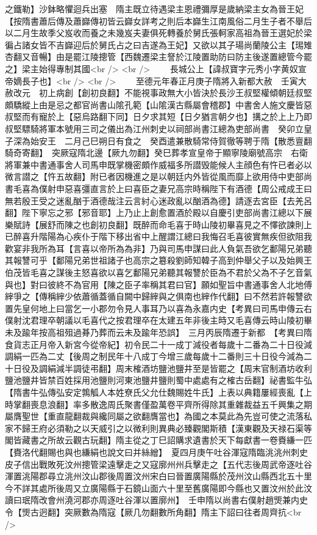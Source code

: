 之鐵勒】沙鉢略懼迴兵出塞　隋主既立待遇梁主恩禮彌厚是歲納梁主女為晉王妃【按隋書蕭后傳及蕭巋傳初皆云巋女詳考之則后本巋生江南風俗二月生子者不舉后以二月生故季父岌收而養之未幾岌夫妻俱死轉養於舅氏張軻家高祖為晉王選妃於梁徧占諸女皆不吉巋迎后於舅氏占之曰吉遂為王妃】又欲以其子瑒尚蘭陵公主【㻛雉杏翻又音暢】由是罷江陵摠管【西魏遷梁主詧於江陵置助防曰防主後遂置總管今罷之】梁主始得專制其國<br />
<br />
　　長城公上【諱叔寶字元秀小字黄奴宣帝嫡長子也】<br />
<br />
　　至德元年春正月庚子隋將入新都大赦　壬寅大赦改元　初上病創【創初良翻】不能視事政無大小皆決於長沙王叔堅權傾朝廷叔堅頗驕縱上由是忌之都官尚書山隂孔範【山隂漢古縣屬會稽郡】中書舍人施文慶皆惡叔堅而有寵於上【惡烏路翻下同】日夕求其短【日夕猶言朝夕也】搆之於上上乃即叔堅驃騎將軍本號用三司之儀出為江州刺史以祠部尚書江總為吏部尚書　癸卯立皇子深為始安王　二月己巳朔日有食之　癸酉遣兼散騎常侍賀徹等聘于隋【散悉亶翻騎奇寄翻】　突厥寇隋北邊【厥九勿翻】癸巳葬孝宣皇帝于顯寧陵廟號高宗　右衛將軍兼中書通事舍人司馬申既掌機密頗作威福多所譛毁能候人主顔色有忤已者必以微言譛之【忤五故翻】附已者因機進之是以朝廷内外皆從風而靡上欲用侍中吏部尚書毛喜為僕射申惡喜彊直言於上曰喜臣之妻兄高宗時稱陛下有酒德【周公戒成王曰無若殷王受之迷亂酗于酒德哉注云言紂心迷政亂以酗酒為德】請逐去宮臣【去羌呂翻】陛下寧忘之邪【邪音耶】上乃止上創愈置酒於殿以自慶引吏部尚書江總以下展樂賦詩【展舒而陳之也創初良翻】既醉而命毛喜于時山陵初畢喜見之不懌欲諫則上已醉喜升階陽為心疾仆于階下移出省中上醒謂江總曰我悔召毛喜彼實無疾但欲阻我歡宴非我所為耳【言喜以帝所為為非】乃與司馬申謀曰此人負氣吾欲乞鄱陽兄弟聽其報讐可乎【鄱陽兄弟世祖諸子也高宗之簒殺劉師知韓子高到仲舉父子以及始興王伯茂皆毛喜之謀後主怒喜欲以喜乞鄱陽兄弟聽其報讐於臣為不君於父為不子乞音氣與也】對曰彼終不為官用【陳之臣子率稱其君曰官】願如聖旨中書通事舍人北地傅縡爭之【傳稱縡少依蕭循蓋循自闕中歸縡與之俱南也縡作代翻】曰不然若許報讐欲置先皇何地上曰當乞一小郡勿令見人事耳乃以喜為永嘉内史【考異曰司馬申傳云右僕射沈君理卒朝議以毛喜代之按君理卒在太建五年非後主時又毛喜傳云時山陵初畢未及踰年按高祖殂過朞乃葬而云未及踰年恐誤】　三月丙辰隋遷于新都　【考異曰隋食貨志正月帝入新宮今從帝紀】初令民二十一成丁減役者每歲十二番為二十日役減調絹一匹為二丈【後周之制民年十八成丁今增三歲每歲十二番則三十日役今減為二十日役及調絹減半調徒弔翻】周末榷酒坊鹽池鹽井至是皆罷之【周末官制酒坊收利鹽池鹽井皆禁百姓採用池鹽則河東池鹽井鹽則蜀中處處有之榷古岳翻】祕書監牛弘【隋書牛弘傳弘安定鶉觚人本姓尞氏父允仕魏賜姓牛氏】上表以典籍屢經喪亂【上時掌翻喪息浪翻】率多散逸周氏聚書僅盈萬卷平齊所得除其重雜裁益五千興集之期屬膺聖世【重直龍翻裁與纔同屬之欲翻膺當也】為國之本莫此為先豈可使之流落私家不歸王府必須勒之以天威引之以微利則異典必臻觀閣斯積【漢東觀及天禄石渠等閣皆藏書之所故云觀古玩翻】隋主從之丁巳詔購求遺書於天下每獻書一卷賚縑一匹【賚洛代翻賜也與也縑絹也說文曰并絲繒】　夏四月庚午吐谷渾寇隋臨洮洮州刺史皮子信出戰敗死汶州摠管梁遠擊走之又寇廓州州兵擊走之【五代志後周武帝逐吐谷渾置洮陽郡尋立洮州汶山郡後周置汶州宋白曰晉置廣陽縣於茂州汶山縣西北五十里今不詳其處所後周又立廣陽縣于石鏡山面六十里至舊廣陽即今縣也又置汶州於此汶讀曰珉隋改會州澆河郡亦周逐吐谷渾以置廓州】　壬申隋以尚書右僕射趙煚兼内史令【煚古迥翻】突厥數為隋寇【厥几勿翻數所角翻】隋主下詔曰往者周齊抗<br />
